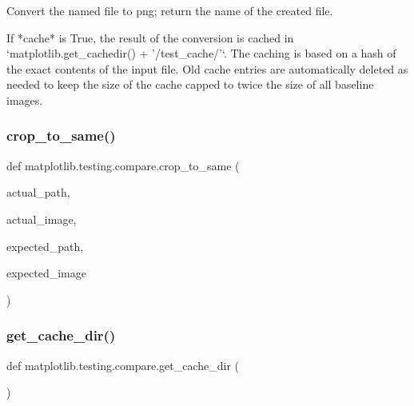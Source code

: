 \begin{DoxyVerb}Convert the named file to png; return the name of the created file.

If *cache* is True, the result of the conversion is cached in
`matplotlib.get_cachedir() + '/test_cache/'`.  The caching is based on a
hash of the exact contents of the input file.  Old cache entries are
automatically deleted as needed to keep the size of the cache capped to
twice the size of all baseline images.
\end{DoxyVerb}
 \mbox{\label{namespacematplotlib_1_1testing_1_1compare_a90cba8809a5706e2c0b31a908de4924d}} 
\subsubsection{\texorpdfstring{crop\+\_\+to\+\_\+same()}{crop\_to\_same()}}
{\footnotesize\ttfamily def matplotlib.\+testing.\+compare.\+crop\+\_\+to\+\_\+same (\begin{DoxyParamCaption}\item[{}]{actual\+\_\+path,  }\item[{}]{actual\+\_\+image,  }\item[{}]{expected\+\_\+path,  }\item[{}]{expected\+\_\+image }\end{DoxyParamCaption})}

\mbox{\label{namespacematplotlib_1_1testing_1_1compare_a1996334d8a1c816f484bb22504a74b33}} 
\subsubsection{\texorpdfstring{get\+\_\+cache\+\_\+dir()}{get\_cache\_dir()}}
{\footnotesize\ttfamily def matplotlib.\+testing.\+compare.\+get\+\_\+cache\+\_\+dir (\begin{DoxyParamCaption}{ }\end{DoxyParamCaption})}

